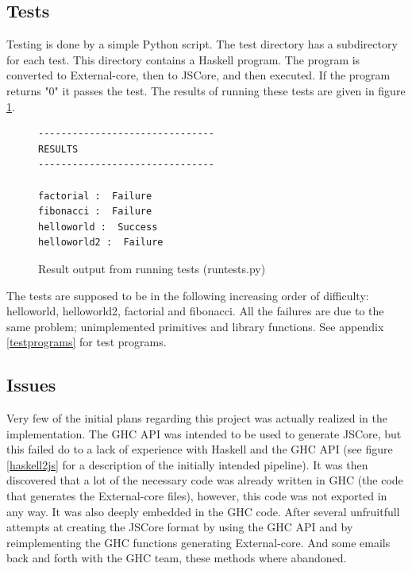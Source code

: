 \subsection{Tests}

Testing is done by a simple Python script. The test directory has a subdirectory 
for each test. This directory
contains a Haskell program. The program is converted to External-core, then 
to JSCore, and then executed.
If the program returns "0" it passes the test. The results of running these 
tests are given in figure \ref{tests}.


\begin{figure}[H]
\begin{center}
\begin{minipage}{0.45\textwidth}
\begin{lstlisting}
-------------------------------
RESULTS
-------------------------------

factorial :  Failure
fibonacci :  Failure
helloworld :  Success
helloworld2 :  Failure
\end{lstlisting}
\end{minipage}
\end{center}
\caption[Result output from running tests]{Result output from running tests (runtests.py)}
\label{tests}
\end{figure}

The tests are supposed to be in the following increasing order of difficulty: 
helloworld, helloworld2, factorial and fibonacci. 
All the failures are due to the same problem; unimplemented 
primitives and library functions. See appendix \ref{testprograms} for test programs.

\subsection{Issues}


Very few of the initial plans regarding this project was actually realized in 
the implementation. The GHC API was intended to be used to generate JSCore, 
but this failed do to a lack of experience with Haskell and the GHC API 
(see figure \ref{haskell2js} for a description of the initially intended
pipeline). It was then discovered that a lot of the necessary code was already
written in GHC (the code that generates the External-core files), however, 
this code was not exported in any way. It was also deeply embedded in the GHC 
code. After several unfruitfull attempts at creating the JSCore format by using the GHC API
and by reimplementing the GHC functions generating External-core. And some emails back 
and forth with the GHC team, these methods where abandoned.


